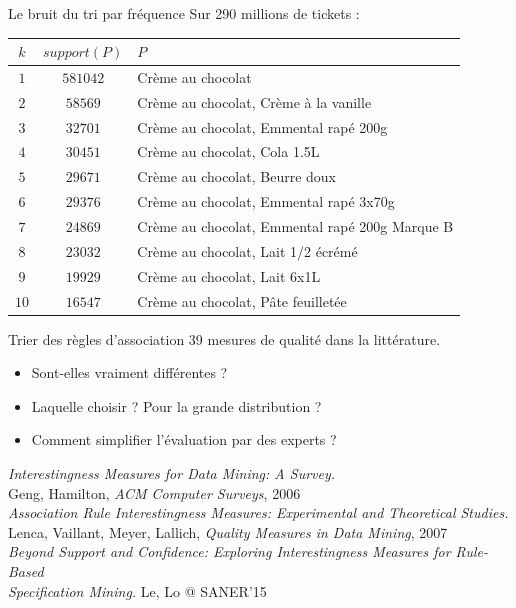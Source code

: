 \documentclass[table]{beamer}
\begin{document}
\begin{frame}{Le bruit du tri par fréquence}
  Sur 290 millions de tickets :
  \begin{table}
    \begin{tabular}{|c|c|l|}
      \hline
      $k$ & $\mathit{support}(P)$ & $P$  \\\hline
      $1$  & $581042$ & Crème au chocolat \\
      $2$  & $58569$ & Crème au chocolat, Crème à la vanille \\
      $3$  & $32701$ & Crème au chocolat, Emmental rapé 200g \\
      $4$  & $30451$ & Crème au chocolat, Cola 1.5L\\
      $5$  & $29671$ & Crème au chocolat, Beurre doux\\
      $6$  & $29376$ & Crème au chocolat, Emmental rapé 3x70g\\
      $7$  & $24869$ & Crème au chocolat, Emmental rapé 200g Marque B\\
      $8$  & $23032$ & Crème au chocolat, Lait 1/2 écrémé\\
      $9$  & $19929$ & Crème au chocolat, Lait 6x1L\\
      $10$ & $16547$ & Crème au chocolat, Pâte feuilletée\\
      \hline
    \end{tabular}
  \end{table}
\end{frame}

\begin{frame}{Trier des règles d'association}
  39 mesures de qualité dans la littérature.

  \begin{itemize}
    \item Sont-elles vraiment différentes ?
    \item Laquelle choisir ? Pour la grande distribution ?
    \item Comment simplifier l'évaluation par des experts ?
  \end{itemize}
  \vspace{1em}

  \vfill
  \begin{footnotesize}
    \setlength{\baselineskip}{-0.5em}
    {\em Interestingness Measures for Data Mining: A Survey.}\\
    Geng, Hamilton, {\em ACM Computer Surveys}, 2006\\
    \medskip
    {\em Association Rule Interestingness Measures: Experimental and Theoretical Studies.}\\
    Lenca, Vaillant, Meyer, Lallich, {\em Quality Measures in Data Mining}, 2007\\
    \medskip
    {\em Beyond Support and Confidence: Exploring Interestingness Measures for Rule-Based\\ Specification Mining.}
    Le, Lo @ SANER'15\\
  \end{footnotesize}
\end{frame}
\end{document}
